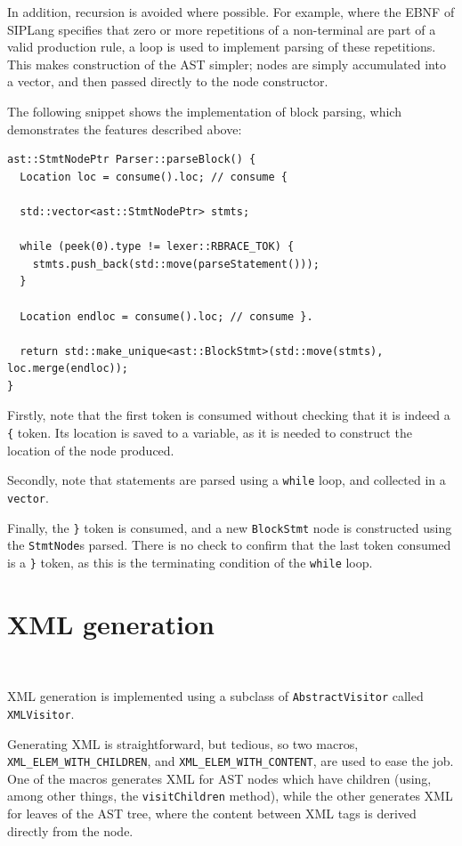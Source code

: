 \documentclass[11pt,a4paper]{scrartcl}
\begin{document}
In addition, recursion is avoided where possible. For example, where the EBNF of SIPLang specifies that zero or more repetitions of a non-terminal are part of a valid production rule, a loop is used to implement parsing of these repetitions. This makes construction of the AST simpler; nodes are simply accumulated into a vector, and then passed directly to the node constructor.

The following snippet shows the implementation of block parsing, which demonstrates the features described above:

\begin{verbatim}
ast::StmtNodePtr Parser::parseBlock() {
  Location loc = consume().loc; // consume {

  std::vector<ast::StmtNodePtr> stmts;

  while (peek(0).type != lexer::RBRACE_TOK) {
    stmts.push_back(std::move(parseStatement()));
  }

  Location endloc = consume().loc; // consume }.

  return std::make_unique<ast::BlockStmt>(std::move(stmts), loc.merge(endloc));
}
\end{verbatim}

Firstly, note that the first token is consumed without checking that it is indeed a \verb!{! token. Its location is saved to a variable, as it is needed to construct the location of the node produced.

Secondly, note that statements are parsed using a \verb!while! loop, and collected in a \verb!vector!.

Finally, the \verb!}! token is consumed, and a new \verb!BlockStmt! node is constructed using the \verb!StmtNode!s parsed. There is no check to confirm that the last token consumed is a \verb!}! token, as this is the terminating condition of the \verb!while! loop.

\newpage

\section{XML generation}~\label{sec:xml-visitor}

XML generation is implemented using a subclass of \verb!AbstractVisitor! called \verb!XMLVisitor!.

Generating XML is straightforward, but tedious, so two macros, \verb!XML_ELEM_WITH_CHILDREN!, and \verb!XML_ELEM_WITH_CONTENT!, are used to ease the job. One of the macros generates XML for AST nodes which have children (using, among other things, the \verb!visitChildren! method), while the other generates XML for leaves of the AST tree, where the content between XML tags is derived directly from the node.
\end{document}
